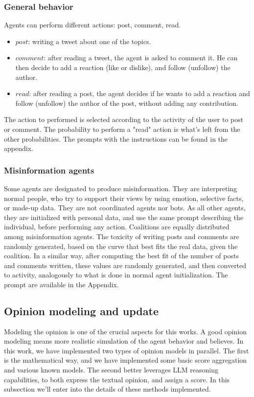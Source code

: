 \subsubsection{General behavior}
Agents can perform different actions: post, comment, read.
\begin{itemize}
    \item $post$: writing a tweet about one of the topics.
    \item $comment$: after reading a tweet, the agent is asked to comment it. He can then decide to add a reaction (like or dislike), and follow (unfollow) the author.
    \item $read$: after reading a post, the agent decides if he wants to add a reaction and follow (unfollow) the author of the post, without adding any contribution.
\end{itemize}

The action to performed is selected according to the activity of the user to post or comment. The probability to perform a "read" action is what's left from the other probabilities.
The prompts with the instructions can be found in the appendix.

\subsubsection{Misinformation agents}
Some agents are designated to produce misinformation. They are interpreting normal people, who try to support their views by using emotion, selective facts, or made-up data. They are not coordinated agents nor bots.
As all other agents, they are initialized with personal data, and use the same prompt describing the individual, before performing any action.
Coalitions are equally distributed among misinformation agents.
The toxicity of writing posts and comments are randomly generated, based on the curve that best fits the real data, given the coalition.
In a similar way, after computing the best fit of the number of posts and comments written, these values are randomly generated, and then converted to activity, analogously to what is done in normal agent initialization.
The prompt are available in the Appendix.

\subsection{Opinion modeling and update}
Modeling the opinion is one of the crucial aspects for this works. A good opinion modeling means more realistic simulation of the agent behavior and believes.
In this work, we have implemented two types of opinion models in parallel. The first is the mathematical way, and we have implemented some basic score aggregation and various known models. The second better leverages LLM reasoning capabilities, to both express the textual opinion, and assign a score. 
In this subsection we'll enter into the details of these methods implemented.

